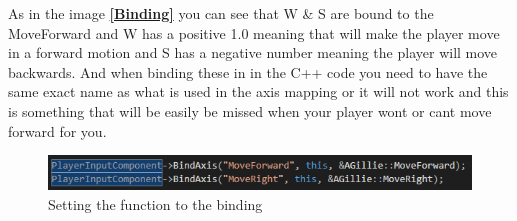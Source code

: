 As in the image \textbf{\ref{Binding}} you can see that W \& S are bound to the MoveForward and W has a positive 1.0 meaning that will make the player move in a forward motion and S has a negative number meaning the player will move backwards. And when binding these in in the C++ code you need to have the same exact name as what is used in the axis mapping or it will not work and this is something that will be easily be missed when your player wont or cant move forward for you.

\begin{figure}[H]
    \centering
    \includegraphics[scale=.9]{img/Mappings.PNG}
    \caption{Setting the function to the binding}
    \label{Mappings}
\end{figure}

